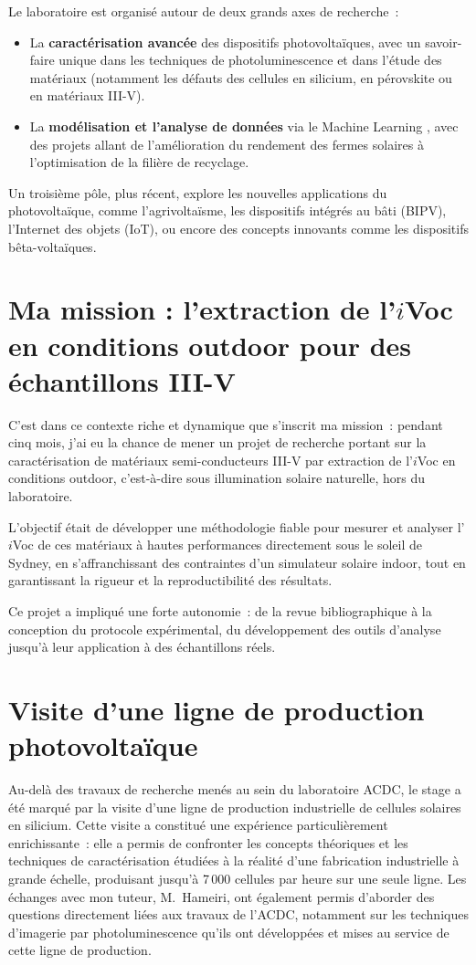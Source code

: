 \documentclass[12pt,a4paper]{report}
\begin{document}
Le laboratoire est organisé autour de deux grands axes de recherche~:
\begin{itemize}
  \item La \textbf{caractérisation avancée} des dispositifs photovoltaïques, avec un savoir-faire unique dans les techniques de photoluminescence et dans l'étude des matériaux (notamment les défauts des cellules en silicium, en pérovskite ou en matériaux III-V).
  \item La \textbf{modélisation et l'analyse de données} via le \og Machine Learning \fg{}, avec des projets allant de l'amélioration du rendement des fermes solaires à l'optimisation de la filière de recyclage.
\end{itemize}

Un troisième pôle, plus récent, explore les nouvelles applications du photovoltaïque, comme l'agrivoltaïsme, les dispositifs intégrés au bâti (BIPV), l'Internet des objets (IoT), ou encore des concepts innovants comme les dispositifs bêta-voltaïques.

\section{Ma mission : l'extraction de l'$i$Voc en conditions outdoor pour des échantillons III-V}

C'est dans ce contexte riche et dynamique que s'inscrit ma mission~: pendant cinq mois, j'ai eu la chance de mener un projet de recherche portant sur la caractérisation de matériaux semi-conducteurs III-V par extraction de l'$i$Voc en conditions outdoor, c'est-à-dire sous illumination solaire naturelle, hors du laboratoire.

L'objectif était de développer une méthodologie fiable pour mesurer et analyser l'$i$Voc de ces matériaux à hautes performances directement sous le soleil de Sydney, en s'affranchissant des contraintes d'un simulateur solaire indoor, tout en garantissant la rigueur et la reproductibilité des résultats.

Ce projet a impliqué une forte autonomie~: de la revue bibliographique à la conception du protocole expérimental, du développement des outils d'analyse jusqu'à leur application à des échantillons réels.

\section{Visite d'une ligne de production photovoltaïque}

Au-delà des travaux de recherche menés au sein du laboratoire ACDC, le stage a été marqué par la visite d'une ligne de production industrielle de cellules solaires en silicium. Cette visite a constitué une expérience particulièrement enrichissante~: elle a permis de confronter les concepts théoriques et les techniques de caractérisation étudiées à la réalité d'une fabrication industrielle à grande échelle, produisant jusqu'à 7\,000 cellules par heure sur une seule ligne. Les échanges avec mon tuteur, M.\ Hameiri, ont également permis d'aborder des questions directement liées aux travaux de l'ACDC, notamment sur les techniques d'imagerie par photoluminescence qu'ils ont développées et mises au service de cette ligne de production.
\end{document}
